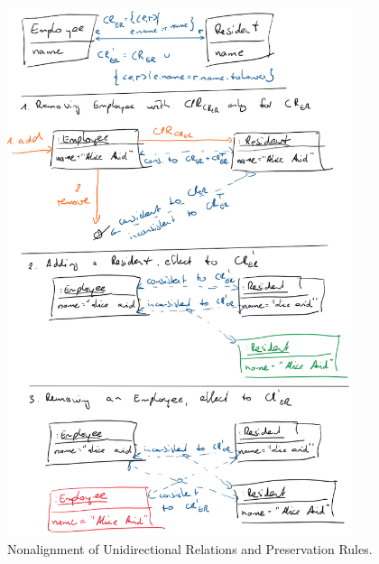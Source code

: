 \begin{figure}
    \centering
    \includegraphics[width=0.9\textwidth]{figures/correctness/synchronization/unidirectional_nonalignment.png}
    \caption[Nonalignment of Unidirectional Relations and Preservation Rules]{Nonalignment of Unidirectional Relations and Preservation Rules. %
    }
    \label{fig:synchronization:unidirectional_nonalignment}
\end{figure}

